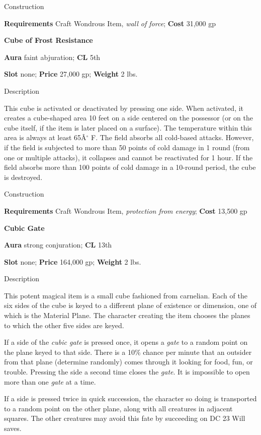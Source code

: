 Construction
				
\textbf{Requirements} Craft Wondrous Item, \textit{wall of force}; \textbf{Cost }31,000 gp
				
\textbf{Cube of Frost Resistance}
				
\textbf{Aura} faint abjuration;\textbf{ CL }5th
				
\textbf{Slot} none; \textbf{Price} 27,000 gp; \textbf{Weight }2 lbs.
				
Description
				
This cube is activated or deactivated by pressing one side. When activated, it creates a cube-shaped area 10 feet on a side centered on the possessor (or on the cube itself, if the item is later placed on a surface)\textit{. }The temperature within this area is always at least 65\^A\mbox{${}^\circ$} F. The field absorbs all cold-based attacks. However, if the field is subjected to more than 50 points of cold damage in 1 round (from one or multiple attacks), it collapses and cannot be reactivated for 1 hour. If the field absorbs more than 100 points of cold damage in a 10-round period, the cube is destroyed. 
				
Construction
				
\textbf{Requirements} Craft Wondrous Item, \textit{protection from energy}; \textbf{Cost }13,500 gp
				
\textbf{Cubic Gate}
				
\textbf{Aura} strong conjuration;\textbf{ CL }13th
				
\textbf{Slot} none; \textbf{Price} 164,000 gp; \textbf{Weight }2 lbs.
				
Description
				
This potent magical item is a small cube fashioned from carnelian. Each of the six sides of the cube is keyed to a different plane of existence or dimension, one of which is the Material Plane. The character creating the item chooses the planes to which the other five sides are keyed.
				
If a side of the \textit{cubic gate }is pressed once, it opens a \textit{gate }to a random point on the plane keyed to that side. There is a 10\% chance per minute that an outsider from that plane (determine randomly) comes through it looking for food, fun, or trouble. Pressing the side a second time closes the \textit{gate}. It is impossible to open more than one \textit{gate }at a time.
				
If a side is pressed twice in quick succession, the character so doing is transported to a random point on the other plane, along with all creatures in adjacent squares. The other creatures may avoid this fate by succeeding on DC 23 Will saves. 
				
